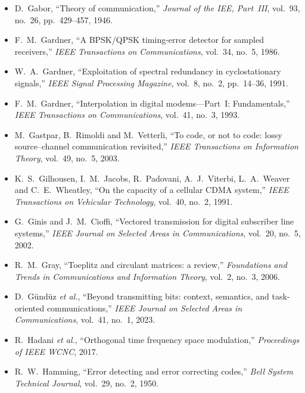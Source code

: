 \begin{itemize}[leftmargin=1.5em,itemindent=-1.5em,itemsep=1.5pt plus 1pt,parsep=0pt,topsep=4pt,label={}]
\item D.~Gabor, ``Theory of communication,'' \emph{Journal of the IEE, Part~III}, vol.~93, no.~26, pp.~429--457, 1946.
\item F.~M.~Gardner, ``A BPSK/QPSK timing-error detector for sampled receivers,'' \emph{IEEE Transactions on Communications}, vol.~34, no.~5, 1986.
\item W.~A.~Gardner, ``Exploitation of spectral redundancy in cyclostationary signals,'' \emph{IEEE Signal Processing Magazine}, vol.~8, no.~2, pp.~14--36, 1991.
\item F.~M.~Gardner, ``Interpolation in digital modems---Part~I: Fundamentals,'' \emph{IEEE Transactions on Communications}, vol.~41, no.~3, 1993.
\item M.~Gastpar, B.~Rimoldi and M.~Vetterli, ``To code, or not to code: lossy source--channel communication revisited,'' \emph{IEEE Transactions on Information Theory}, vol.~49, no.~5, 2003.
\item K.~S.~Gilhousen, I.~M.~Jacobs, R.~Padovani, A.~J.~Viterbi, L.~A.~Weaver and C.~E.~Wheatley, ``On the capacity of a cellular CDMA system,'' \emph{IEEE Transactions on Vehicular Technology}, vol.~40, no.~2, 1991.
\item G.~Ginis and J.~M.~Cioffi, ``Vectored transmission for digital subscriber line systems,'' \emph{IEEE Journal on Selected Areas in Communications}, vol.~20, no.~5, 2002.
\item R.~M.~Gray, ``Toeplitz and circulant matrices: a review,'' \emph{Foundations and Trends in Communications and Information Theory}, vol.~2, no.~3, 2006.
\item D.~G\"und\"uz \emph{et al.}, ``Beyond transmitting bits: context, semantics, and task-oriented communications,'' \emph{IEEE Journal on Selected Areas in Communications}, vol.~41, no.~1, 2023.
\item R.~Hadani \emph{et al.}, ``Orthogonal time frequency space modulation,'' \emph{Proceedings of IEEE WCNC}, 2017.
\item R.~W.~Hamming, ``Error detecting and error correcting codes,'' \emph{Bell System Technical Journal}, vol.~29, no.~2, 1950.

\end{itemize}

